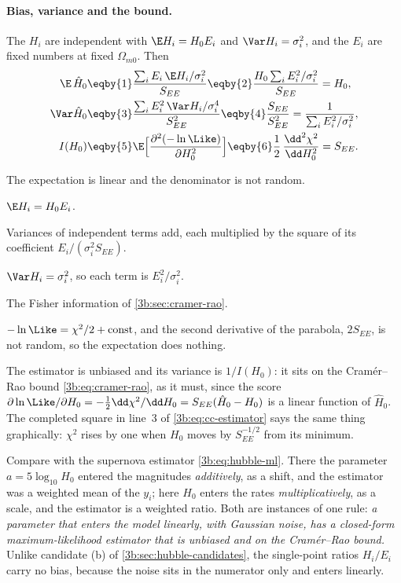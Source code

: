 \paragraph{Bias, variance and the bound.}
The $H_i$ are independent with $\E H_i=H_0E_i$ and $\Var H_i=\sigma_i^2$, and the $E_i$ are
fixed numbers at fixed $\Omega_{m0}$. Then
\begin{align}
  \E\,\hat H_0
  &\eqby{1}\frac{\sum_iE_i\,\E H_i/\sigma_i^2}{S_{EE}}
   \eqby{2}\frac{H_0\sum_iE_i^2/\sigma_i^2}{S_{EE}}=H_0,
  \nonumber\\
  \Var\hat H_0
  &\eqby{3}\frac{\sum_iE_i^2\,\Var H_i/\sigma_i^4}{S_{EE}^2}
   \eqby{4}\frac{S_{EE}}{S_{EE}^2}=\frac{1}{\sum_iE_i^2/\sigma_i^2},
  \nonumber\\
  I(H_0)
  &\eqby{5}\E\Bigl[\frac{\partial^2(-\ln\Like)}{\partial H_0^2}\Bigr]
   \eqby{6}\frac12\,\frac{\dd^2\chi^2}{\dd H_0^2}=S_{EE} .
  \label{3b:eq:cc-variance}
\end{align}
\begin{explain}
  \item The expectation is linear and the denominator is not random.
  \item $\E H_i=H_0E_i$.
  \item Variances of independent terms add, each multiplied by the square of its coefficient
        $E_i/(\sigma_i^2S_{EE})$.
  \item $\Var H_i=\sigma_i^2$, so each term is $E_i^2/\sigma_i^2$.
  \item The Fisher information of \cref{3b:sec:cramer-rao}.
  \item $-\ln\Like=\chi^2/2+\text{const}$, and the second derivative of the parabola, $2S_{EE}$,
        is not random, so the expectation does nothing.
\end{explain}
The estimator is unbiased and its variance is $1/I(H_0)$: it sits on the Cram\'er--Rao bound
\eqref{3b:eq:cramer-rao}, as it must, since the score
$\partial\ln\Like/\partial H_0=-\frac12\dd\chi^2/\dd H_0=S_{EE}(\hat H_0-H_0)$ is a linear function
of $\hat H_0$. The completed square in line~3 of \eqref{3b:eq:cc-estimator} says the same thing
graphically: $\chi^2$ rises by one when $H_0$ moves by $S_{EE}^{-1/2}$ from its minimum.

Compare with the supernova estimator \eqref{3b:eq:hubble-ml}. There the parameter
$a=5\log_{10}H_0$ entered the magnitudes \emph{additively}, as a shift, and the estimator was a
weighted mean of the $y_i$; here $H_0$ enters the rates \emph{multiplicatively}, as a scale, and
the estimator is a weighted ratio. Both are instances of one rule: \emph{a parameter that enters
the model linearly, with Gaussian noise, has a closed-form maximum-likelihood estimator that is
unbiased and on the Cram\'er--Rao bound.} Unlike candidate (b) of
\cref{3b:sec:hubble-candidates}, the single-point ratios $H_i/E_i$ carry no bias, because the
noise sits in the numerator only and enters linearly.

